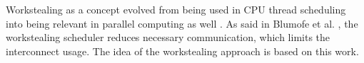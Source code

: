 Workstealing as a concept evolved from being used in CPU thread scheduling \cite{blumofeSchedulingMultithreadedComputations1999} into being relevant in parallel computing as well \cite{letzWorkStealingScheduler2010,mattheisWorkStealingStrategies2012,prellEmbracingExplicitCommunication2016}. As said in Blumofe et al. \cite{blumofeSchedulingMultithreadedComputations1999}, the workstealing scheduler reduces necessary communication, which limits the interconnect usage. The idea of the workstealing approach is based on this work.

